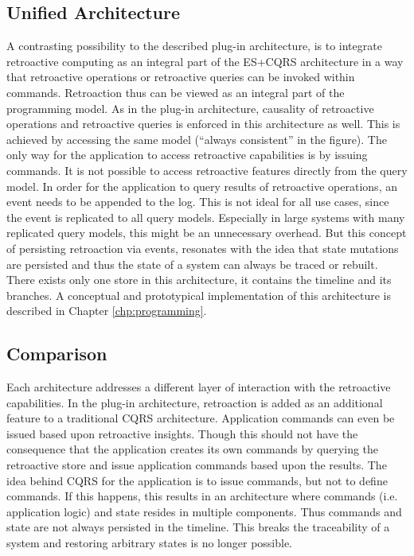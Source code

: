 \subsection{Unified Architecture}
\label{sec:arch:arch-unified}
A contrasting possibility to the described plug-in architecture, is to integrate 
retroactive computing as an integral part of the ES+CQRS architecture in a way 
that retroactive operations or retroactive queries can be invoked within commands.
Retroaction thus can be viewed as an integral part of the programming model. 
As in the plug-in architecture, causality of retroactive operations and 
retroactive queries is enforced in this architecture as well. 
This is achieved by accessing the same model (``always consistent'' in the figure).
The only way for the application to access retroactive capabilities is by 
issuing commands. It is not possible to access retroactive features directly 
from the query model.
%
In order for the application to query results of retroactive operations, an event 
needs to be appended to the log.
This is not ideal for all use cases, since the event is replicated to all query 
models. Especially in large systems with many replicated query models, this
might be an unnecessary overhead.
But this concept of persisting retroaction via events, resonates with the idea 
that state mutations are persisted and thus the state of a system can always be 
traced or rebuilt. 
There exists only one store in this architecture, it contains the timeline and 
its branches. 
%
A conceptual and prototypical implementation of this architecture is described 
in Chapter \ref{chp:programming}.

\subsection{Comparison}
Each architecture addresses a different layer of interaction with the retroactive 
capabilities. In the plug-in architecture, retroaction is added as an additional 
feature to a traditional CQRS architecture. Application commands can even be 
issued based upon retroactive insights. 
Though this should not have the consequence that the application creates its 
own commands by querying the retroactive store and issue application commands 
based upon the results. 
The idea behind CQRS for the application is to issue commands, but not to define 
commands. If this happens, %
this results in an architecture where commands (i.e. application logic) and state 
resides in multiple components.
Thus commands and state are not always persisted in the timeline. This breaks the 
traceability of a system and restoring arbitrary states is no longer possible.


